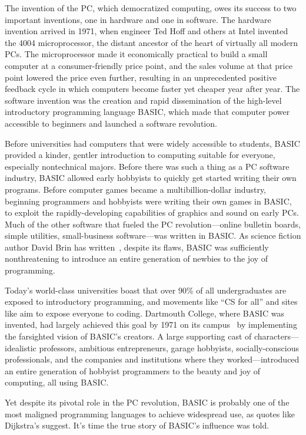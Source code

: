 

The invention of the PC, which democratized computing, owes its success
to two important inventions, one in hardware and one in software.
The hardware invention arrived in 1971, when engineer Ted Hoff and others
at Intel invented the 4004 microprocessor, the distant ancestor of
the heart of virtually all modern PCs.  The microprocessor made it
economically practical to build a small computer at a consumer-friendly price
point, and the sales volume at that price point lowered the price even
further, resulting in an unprecedented positive feedback cycle in
which computers become faster yet cheaper year after year.
The software invention was the creation and rapid dissemination of the
high-level introductory programming language BASIC, which made that
computer power accessible to beginners and launched a software revolution.

Before universities had computers that were widely accessible to students, BASIC
provided a kinder, gentler introduction to computing suitable for
everyone, especially nontechnical majors.
Before there was such a thing as a PC software industry, 
BASIC allowed early hobbyists to quickly get started writing their own
programs.
Before computer games became a multibillion-dollar industry, beginning
programmers and hobbyists were writing their own games in BASIC, to
exploit the rapidly-developing capabilities of graphics and sound on
early PCs. 
Much of the other software that fueled the PC revolution---online
bulletin boards, simple utilities, small-business software---was written
in BASIC. 
As science fiction author David Brin has written~\cite{why_johnny_cant_code},
despite its flaws, BASIC
was sufficiently nonthreatening to introduce an entire generation of
newbies to the joy of programming.

Today's world-class universities boast that over 90\% of all
undergraduates are exposed to introductory programming, and movements
like ``CS for all'' and sites like  aim to expose everyone
to coding.
Dartmouth College, where BASIC was invented, had largely
achieved this goal by 1971 on its campus~\cite{man_and_computer} by implementing the
farsighted vision of BASIC's creators.
A large supporting cast of characters---idealistic professors,
ambitious entrepreneurs, garage hobbyists, socially-conscious
professionals, and the companies and institutions where they
worked---introduced  an entire generation
of hobbyist programmers to the beauty and joy of computing, all using BASIC.

Yet despite its pivotal role in the PC revolution, BASIC is probably
one of the most maligned programming languages to achieve widespread
use, as quotes like Dijkstra's suggest.
It's time the true story of BASIC's influence was told.

